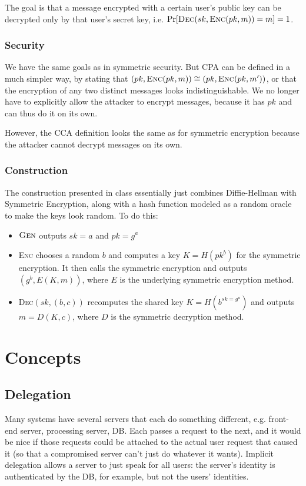 \documentclass{article}
\begin{document}
\begin{multicols*}{2}
	The goal is that a message encrypted with a certain user's public key can be decrypted only by that user's secret key, i.e. $\text{Pr}[\textsc{Dec}(sk, \textsc{Enc}(pk, m)) = m] = 1$.

	\subsubsection{Security}
	We have the same goals as in symmetric security. But CPA can be defined in a much simpler way, by stating that $(pk, \textsc{Enc}(pk, m)) \cong (pk, \textsc{Enc}(pk, m'))$, or that the encryption of any two distinct messages looks indistinguishable. We no longer have to explicitly allow the attacker to encrypt messages, because it has $pk$ and can thus do it on its own.

	However, the CCA definition looks the same as for symmetric encryption because the attacker cannot decrypt messages on its own.

	\subsubsection{Construction}
	The construction presented in class essentially just combines Diffie-Hellman with Symmetric Encryption, along with a hash function modeled as a random oracle to make the keys look random. To do this:
	\begin{itemize}[noitemsep, topsep=0pt]
		\item $\textsc{Gen}$ outputs $sk = a$ and $pk = g^a$
		\item \textsc{Enc} chooses a random $b$ and computes a key $K=H(pk^b)$ for the symmetric encryption. It then calls the symmetric encryption and outputs $(g^b, E(K, m))$, where $E$ is the underlying symmetric encryption method.
		\item \textsc{Dec}$(sk, (b, c))$ recomputes the shared key $K = H(b^{sk=g^a})$ and outputs $m=D(K,c)$, where $D$ is the symmetric decryption method.
	\end{itemize}


\section{Concepts}
\subsection{Delegation}
Many systems have several servers that each do something different, e.g. front-end server, processing server, DB. Each passes a request to the next, and it would be nice if those requests could be attached to the actual user request that caused it (so that a compromised server can't just do whatever it wants). Implicit delegation allows a server to just speak for all users: the server's identity is authenticated by the DB, for example, but not the users' identities. 


\end{multicols*}
\end{document}
